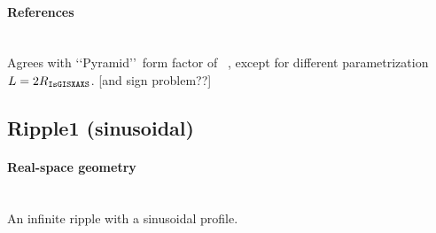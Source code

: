 \paragraph{References}\strut\\
Agrees with \lq\lq Pyramid\rq\rq\ form factor of \IsGISAXS~\cite{Laz02},
except for different parametrization $L=2R_{\rm{\texttt{IsGISXAXS}}}$.
[and sign problem??]

\clearpage
\subsection{Ripple1 (sinusoidal)} \label{sec:Ripple1}  

\paragraph{Real-space geometry}\strut\\
An infinite ripple with a sinusoidal profile.

\begin{figure}[h]
\hfill
{}
\hfill
{}
\hfill
{}
\hfill
\end{figure}

